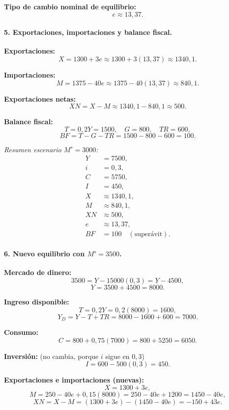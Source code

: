 \documentclass[11pt,addpoints]{article}
\begin{document}
\textbf{Tipo de cambio nominal de equilibrio:}
\[
\boxed{e \approx 13{,}37.}
\]

\paragraph{5. Exportaciones, importaciones y balance fiscal.}

\textbf{Exportaciones:}
\[
X = 1300 + 3e \approx 1300 + 3(13{,}37) \approx 1340{,}1.
\]

\textbf{Importaciones:}
\[
M = 1375 - 40e \approx 1375 - 40(13{,}37) \approx 840{,}1.
\]

\textbf{Exportaciones netas:}
\[
XN = X - M \approx 1340{,}1 - 840{,}1 \approx 500.
\]

\textbf{Balance fiscal:}
\[
T = 0{,}2Y = 1500, \quad G = 800, \quad TR = 600,
\]
\[
BF = T - G - TR = 1500 - 800 - 600 = 100.
\]

\newpage
\vspace*{0.5cm}
\emph{Resumen escenario $M^s = 3000$:}
\begin{align*}
Y & = 7500, \\
i & = 0{,}3, \\
C & = 5750, \\
I & = 450, \\
X & \approx 1340{,}1, \\
M & \approx 840{,}1, \\
XN & \approx 500, \\
e & \approx 13{,}37, \\
BF & = 100 \quad (\text{superávit}).
\end{align*}

\medskip

\paragraph{6. Nuevo equilibrio con $M^s = 3500$.}

\textbf{Mercado de dinero:}
\[
3500 = Y - 15000(0{,}3) = Y - 4500,
\]
\[
Y = 3500 + 4500 = 8000.
\]

\textbf{Ingreso disponible:}
\[
T = 0{,}2Y = 0{,}2(8000) = 1600,
\]
\[
Y_D = Y - T + TR = 8000 - 1600 + 600 = 7000.
\]

\textbf{Consumo:}
\[
C = 800 + 0{,}75(7000) = 800 + 5250 = 6050.
\]

\textbf{Inversión:} (no cambia, porque $i$ sigue en $0{,}3$)
\[
I = 600 - 500(0{,}3) = 450.
\]

\textbf{Exportaciones e importaciones (nuevas):}
\[
X = 1300 + 3e,
\]
\[
M = 250 - 40e + 0{,}15(8000) = 250 - 40e + 1200 = 1450 - 40e,
\]
\[
XN = X - M = (1300 + 3e) - (1450 - 40e) = -150 + 43e.
\]
\end{document}
